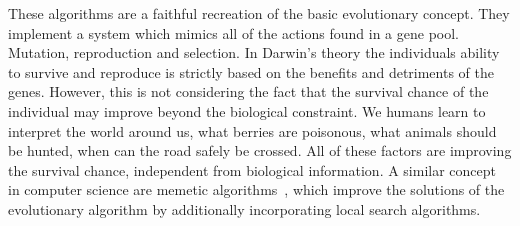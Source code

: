 \documentclass[a4paper,12pt,titlepage, BCOR7mm,headsepline]{scrbook}
\numberwithin{equation}{section}
\begin{document}
These algorithms are a faithful recreation of the basic evolutionary concept. They implement a system which mimics all of the actions found in a gene pool. Mutation, reproduction and selection. In Darwin's theory the individuals ability to survive and reproduce is strictly based on the benefits and detriments of the genes. However, this is not considering the fact that the survival chance of the individual may improve beyond the biological constraint. We humans learn to interpret the world around us, what berries are poisonous, what animals should be hunted, when can the road safely be crossed. All of these factors are improving the survival chance, independent from biological information. A similar concept in computer science are memetic algorithms~\cite{moscato1989evolution}, which improve the solutions of the evolutionary algorithm by additionally incorporating local search algorithms. 



%
%
%
%
%
%
\end{document}
